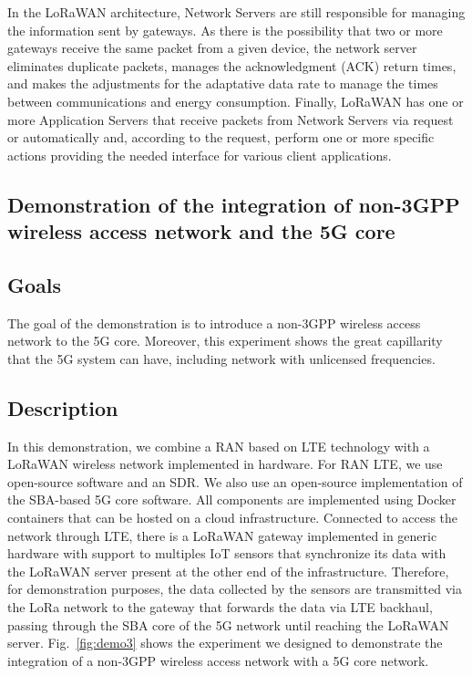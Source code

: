 In the LoRaWAN architecture, Network Servers are still responsible for managing the information sent by gateways. As there is the possibility that two or more gateways receive the same packet from a given device, the network server eliminates duplicate packets, manages the acknowledgment (ACK) return times, and makes the adjustments for the adaptative data rate to manage the times between communications and energy consumption. Finally, LoRaWAN has one or more Application Servers that receive packets from Network Servers via request or automatically and, according to the request, perform one or more specific actions providing the needed interface for various client applications. 

\subsection{Demonstration of the integration of non-3GPP wireless access network and the 5G core} \label{sec:eRAN}

\subsection*{Goals}

The goal of the demonstration is to introduce a non-3GPP wireless access network to the 5G core. Moreover, this experiment shows the great capillarity that the 5G system can have, including network with unlicensed frequencies. 

\subsection*{Description}

In this demonstration, we combine a RAN based on LTE technology with a LoRaWAN wireless network implemented in hardware. For RAN LTE, we use open-source software and an SDR. We also use an open-source implementation of the SBA-based 5G core software. All components are implemented using Docker containers that can be hosted on a cloud infrastructure. Connected to access the network through LTE, there is a LoRaWAN gateway implemented in generic hardware with support to multiples IoT sensors that synchronize its data with the LoRaWAN server present at the other end of the infrastructure. Therefore, for demonstration purposes, the data collected by the sensors are transmitted via the LoRa network to the gateway that forwards the data via LTE backhaul, passing through the SBA core of the 5G network until reaching the LoRaWAN server. Fig.~\ref{fig:demo3} shows the experiment we designed to demonstrate the integration of a non-3GPP wireless access network with a 5G core network.


